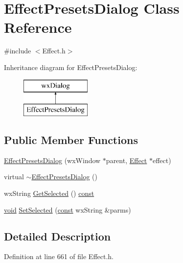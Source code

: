 \hypertarget{class_effect_presets_dialog}{}\section{Effect\+Presets\+Dialog Class Reference}
\label{class_effect_presets_dialog}


{\ttfamily \#include $<$Effect.\+h$>$}

Inheritance diagram for Effect\+Presets\+Dialog\+:\begin{figure}[H]
\begin{center}
\leavevmode
\includegraphics[height=2.000000cm]{class_effect_presets_dialog}
\end{center}
\end{figure}
\subsection*{Public Member Functions}
\begin{DoxyCompactItemize}
\item 
\hyperlink{class_effect_presets_dialog_a9f06d4d69e3418c36f5fde28865d0dbc}{Effect\+Presets\+Dialog} (wx\+Window $\ast$parent, \hyperlink{class_effect}{Effect} $\ast$effect)
\item 
virtual \hyperlink{class_effect_presets_dialog_a7e734f661bc2b480a2bc47928cb664a9}{$\sim$\+Effect\+Presets\+Dialog} ()
\item 
wx\+String \hyperlink{class_effect_presets_dialog_a8a05443472cecb0873c03406a858cbc8}{Get\+Selected} () \hyperlink{getopt1_8c_a2c212835823e3c54a8ab6d95c652660e}{const} 
\item 
\hyperlink{sound_8c_ae35f5844602719cf66324f4de2a658b3}{void} \hyperlink{class_effect_presets_dialog_a9255d97313d33519ca8c1622d39e3c37}{Set\+Selected} (\hyperlink{getopt1_8c_a2c212835823e3c54a8ab6d95c652660e}{const} wx\+String \&parms)
\end{DoxyCompactItemize}


\subsection{Detailed Description}


Definition at line 661 of file Effect.\+h.



